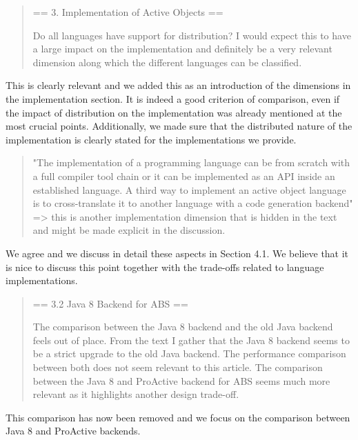\documentclass{article}
\begin{document}
\begin{quote}
	== 3. Implementation of Active Objects ==

Do all languages have support for distribution? I would expect this to have a large 
impact on the implementation and definitely be a very relevant dimension along which the 
different languages can be classified.
\end{quote}
This is clearly relevant and  we added this as an introduction of the dimensions in the 
implementation section. It 
is indeed a good criterion of comparison, even if the impact of 
distribution on the implementation was already 
mentioned at the most crucial points. Additionally, we made sure that the distributed 
nature of the 
implementation is clearly stated for the implementations we provide.


\begin{quote}
 "The implementation of a programming language can be from scratch with a full compiler 
tool chain or it can be implemented as an API inside an established language. A third way 
to implement an active object language is to cross-translate it to another language with 
a code generation backend" => this is another implementation dimension that is hidden in 
the text and might be made explicit in the discussion.
\end{quote}
We agree and we discuss in detail these aspects in  Section 4.1. We believe that it 
is nice to discuss this point together with the trade-offs related to language 
implementations.


\begin{quote}
	== 3.2 Java 8 Backend for ABS ==

The comparison between the Java 8 backend and the old Java backend feels out of place. 
From the text I gather that the Java 8 backend seems to be a strict upgrade to the old 
Java backend. The performance comparison between both does not seem relevant to this 
article.
The comparison between the Java 8 and ProActive backend for ABS seems much more relevant 
as it highlights another design trade-off.
\end{quote}
This comparison has now been removed and we focus on the comparison between Java 8 and 
ProActive backends.
\end{document}

